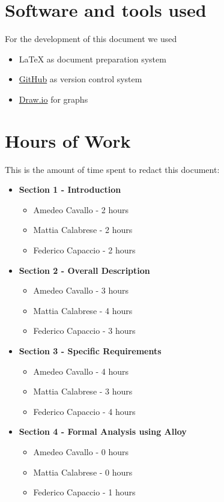 \begin{appendices}

	\section{Software and tools used}
	For the development of this document we used
	\begin{itemize}
		\item \LaTeX{} as document preparation system
		\item \href{http://github.com}{GitHub} as version control system
		\item \href{http://draw.io}{Draw.io} for graphs
	\end{itemize}
		
	\section{Hours of Work}
	This is the amount of time spent to redact this document:
	\begin{itemize}
		\item \textbf{Section 1 - Introduction}
		\begin{itemize}
			\item Amedeo Cavallo - 2 hours
			\item Mattia Calabrese - 2 hours
			\item Federico Capaccio - 2 hours
		\end{itemize}
		
		\item \textbf{Section 2 - Overall Description}
		\begin{itemize}
			\item Amedeo Cavallo - 3 hours
			\item Mattia Calabrese - 4 hours
			\item Federico Capaccio - 3 hours
		\end{itemize}
		
		\item \textbf{Section 3 - Specific Requirements}
		\begin{itemize}
			\item Amedeo Cavallo - 4 hours
			\item Mattia Calabrese - 3 hours
			\item Federico Capaccio - 4 hours
		\end{itemize}
		
		\item \textbf{Section 4 - Formal Analysis using Alloy}
		\begin{itemize}
			\item Amedeo Cavallo - 0 hours
			\item Mattia Calabrese - 0 hours
			\item Federico Capaccio - 1 hours
		\end{itemize}
	\end{itemize}
	

\end{appendices}
